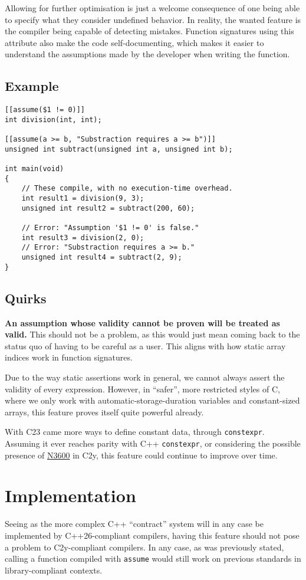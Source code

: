 \documentclass[a4paper, 12pt]{article}
\begin{document}
Allowing for further optimisation is just a welcome consequence of one being able
to specify what they consider undefined behavior.  In reality, the wanted feature is the compiler
being capable of detecting mistakes.  Function signatures using this attribute also
make the code self-documenting, which makes it easier to understand the assumptions made by the developer
when writing the function.
\subsection{Example}
\label{sec:org6e883ca}
\begin{verbatim}
[[assume($1 != 0)]]
int division(int, int);

[[assume(a >= b, "Substraction requires a >= b")]]
unsigned int subtract(unsigned int a, unsigned int b);

int main(void)
{
    // These compile, with no execution-time overhead.
    int result1 = division(9, 3);
    unsigned int result2 = subtract(200, 60);

    // Error: "Assumption '$1 != 0' is false."
    int result3 = division(2, 0);
    // Error: "Substraction requires a >= b."
    unsigned int result4 = subtract(2, 9);
}
\end{verbatim}
\subsection{Quirks}
\label{sec:org7a60b83}
\textbf{An assumption whose validity cannot be proven will be treated as valid.}
This should not be a problem, as this would just mean coming back to the
status quo of having to be careful as a user.
This aligns with how static array indices work in function signatures.

Due to the way static assertions work in general, we cannot always assert
the validity of every expression.  However, in ``safer'', more restricted
styles of C, where we only work with automatic-storage-duration variables
and constant-sized arrays, this feature proves itself quite powerful already.

With C23 came more ways to define constant data, through \texttt{constexpr}.  Assuming
it ever reaches parity with C++ \texttt{constexpr}, or considering the possible
presence of \href{https://open-std.org/jtc1/sc22/wg14/www/docs/n3600.htm}{N3600} in C2y, this feature could continue to improve over time.
\section{Implementation}
\label{sec:org97de7bb}
Seeing as the more complex C++ ``contract'' system will in any case be implemented
by C++26-compliant compilers, having this feature should not pose a problem to
C2y-compliant compilers. In any case, as was previously stated, calling a function
compiled with \texttt{assume} would still work on previous standards in library-compliant
contexts.
\end{document}
